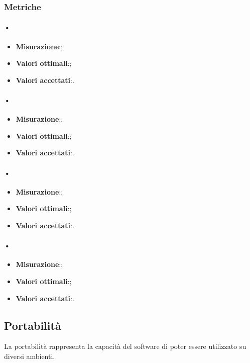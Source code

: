 \subsubsection{Metriche}

\paragraph{•}
\begin{itemize}
\item \textbf{Misurazione}:;
\item \textbf{Valori ottimali}:;
\item \textbf{Valori accettati}:.
\end{itemize}

\paragraph{•}
\begin{itemize}
\item \textbf{Misurazione}:;
\item \textbf{Valori ottimali}:;
\item \textbf{Valori accettati}:.
\end{itemize}

\paragraph{•}
\begin{itemize}
\item \textbf{Misurazione}:;
\item \textbf{Valori ottimali}:;
\item \textbf{Valori accettati}:.
\end{itemize}

\paragraph{•}
\begin{itemize}
\item \textbf{Misurazione}:;
\item \textbf{Valori ottimali}:;
\item \textbf{Valori accettati}:.
\end{itemize}

\subsection{Portabilità}
La portabilità rappresenta la capacità del software di poter essere utilizzato su diversi ambienti.

